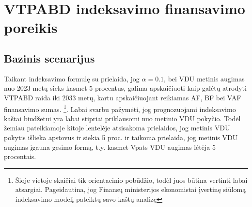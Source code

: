 \documentclass[titlepage, 11pt]{article}
\begin{document}
\newpage
\section{VTPABD indeksavimo finansavimo poreikis}

\subsection{Bazinis scenarijus}

Taikant indeksavimo formulę su prielaida, jog $\alpha=0.1$, bei VDU metinis augimas nuo 2023 metų sieks kasmet 5 procentus, galima apskaičiuoti kaip galėtų atrodyti VTPABD raida iki 2033 metų, kartu apskaičiuojant reikiamas AF, BF bei VAF finansavimo sumas. \footnote{Šioje vietoje skaičiai tik orientacinio pobūdžio, todėl juos būtina vertinti labai atsargiai. Pageidautina, jog Finansų ministerijos ekonomistai įvertinę siūlomą indeksavimo modelį pateiktų savo kaštų analizę}. Labai svarbu pažymėti, jog prognozuojami indeksavimo kaštai biudžetui yra labai stipriai priklausomi nuo metinio VDU pokyčio. Todėl žemiau pateikiamoje kitoje lentelėje atsisakoma prielaidos, jog metinis VDU pokytis išlieka apstovus ir siekia 5 proc. ir taikoma prielaida, jog metinis VDU augimas įgauna gesimo formą, t.y. kasmet Vpats VDU augimas lėtėja 5 procentais.
\end{document}
